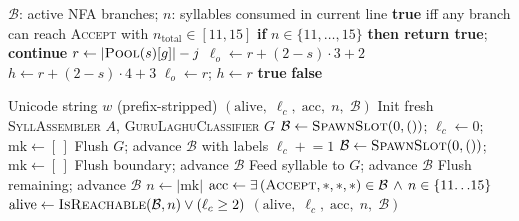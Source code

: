 \begin{algorithm}[H]
\caption{\textsc{IsReachable}: Dead State Detection}
\label{alg:is-reachable}
\scriptsize
\begin{algorithmic}[1]
\Require $\mathcal{B}$: active NFA branches;\;
         $n$: syllables consumed in current line
\Ensure \textbf{true} iff any branch can reach \textsc{Accept}
        with $n_{\text{total}} \in [11, 15]$
        \State \textbf{if} $n \in \{11,\ldots,15\}$
               \textbf{then return true};\;
               \textbf{continue}
    \EndIf
    \State $r \gets |\textsc{Pool}(s)[g]| - j$
     
        \State $\ell_o \gets r + (2{-}s) \cdot 3 + 2$
        \State $h \gets r + (2{-}s) \cdot 4 + 3$
    \Else {}
        \State $\ell_o \gets r$;\; $h \gets r$
    \EndIf
        \State \Return \textbf{true}
    \EndIf
\EndFor
\State \Return \textbf{false} 
\end{algorithmic}
\end{algorithm}



\begin{algorithm}[H]
\caption{\textsc{AnalyzeText}: Stateless FST+NFA Analysis}
\label{alg:analyze-text}
\scriptsize
\begin{algorithmic}[1]
\Require Unicode string $w$ (prefix-stripped)
\Ensure $(\text{alive},\; \ell_c,\; \text{acc},\; n,\; \mathcal{B})$
\State Init fresh \textsc{SyllAssembler} $A$,
       \textsc{GuruLaghuClassifier} $G$
\State $\mathcal{B} \gets \textsc{SpawnSlot}(0, ())$;\;
       $\ell_c \gets 0$;\; $\text{mk} \gets [\,]$
        \State Flush $G$; advance $\mathcal{B}$ with labels
            \State $\ell_c \mathrel{+}= 1$
        \EndIf
        \State $\mathcal{B} \gets \textsc{SpawnSlot}(0,())$;\;
               $\text{mk} \gets [\,]$
        \State Flush boundary; advance $\mathcal{B}$
    \Else
        \State Feed syllable to $G$; advance $\mathcal{B}$
    \EndIf
\EndFor
\State Flush remaining; advance $\mathcal{B}$
\State $n \gets |\text{mk}|$
\State $\text{acc} \gets \exists\,(\textsc{Accept},*,*,*)
       \in \mathcal{B} \,\wedge\, n \in \{11{\ldots}15\}$
\State $\text{alive} \gets \textsc{IsReachable}(\mathcal{B}, n)
       \vee (\ell_c \ge 2)$
\State \Return $(\text{alive},\; \ell_c,\; \text{acc},\; n,\; \mathcal{B})$
\end{algorithmic}
\end{algorithm}


